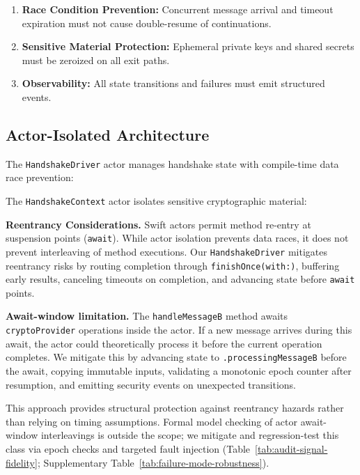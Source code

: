 \documentclass[10pt,journal,compsoc]{IEEEtran}
\providecommand{\tightlist}{%
  \setlength{\itemsep}{0pt}\setlength{\parskip}{0pt}}
\begin{document}
\begin{enumerate}
\tightlist
\item
  \textbf{Race Condition Prevention:} Concurrent message arrival and
  timeout expiration must not cause double-resume of continuations.
\item
  \textbf{Sensitive Material Protection:} Ephemeral private keys and
  shared secrets must be zeroized on all exit paths.
\item
  \textbf{Observability:} All state transitions and failures must emit
  structured events.
\end{enumerate}

\subsection{Actor-Isolated
Architecture}\label{b.-actor-isolated-architecture}

The \texttt{HandshakeDriver} actor manages handshake state with
compile-time data race prevention:


The \texttt{HandshakeContext} actor isolates sensitive cryptographic
material:


\textbf{Reentrancy Considerations.} Swift actors permit method re-entry
at suspension points (\texttt{await}). While actor isolation prevents
data races, it does not prevent interleaving of method executions. Our
\texttt{HandshakeDriver} mitigates reentrancy risks by routing completion
through \texttt{finishOnce(with:)}, buffering early results, canceling
timeouts on completion, and advancing state before \texttt{await}
points.

\textbf{Await-window limitation.} The
\texttt{handle\allowbreak MessageB} method awaits \texttt{cryptoProvider} operations
inside the actor. If a new message arrives during this await, the actor
could theoretically process it before the current operation completes.
We mitigate this by advancing state to \texttt{.processingMessageB}
before the await, copying immutable inputs, validating a monotonic epoch
counter after resumption, and emitting security events on unexpected
transitions.

This approach provides structural protection against reentrancy hazards
rather than relying on timing assumptions. Formal model checking of
actor await-window interleavings is outside the scope; we mitigate and
regression-test this class via epoch checks and targeted fault injection
(Table~\ref{tab:audit-signal-fidelity}; Supplementary
Table~\ref{tab:failure-mode-robustness}).
\end{document}
